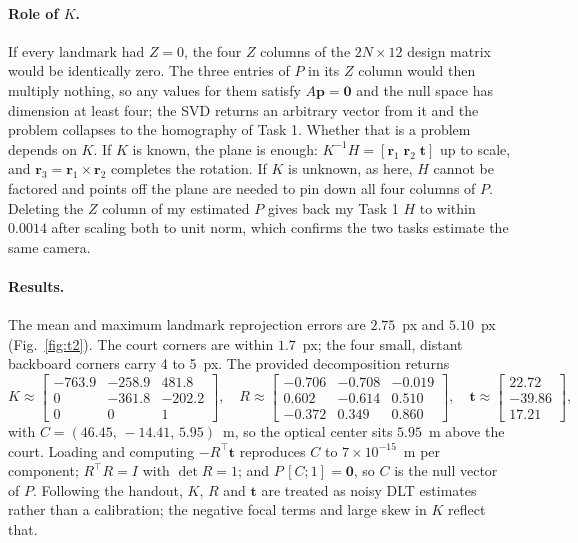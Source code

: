 \documentclass[11pt]{article}
\begin{document}
\paragraph{Role of $K$.} If every landmark had $Z=0$, the four $Z$ columns of the $2N\times12$
design matrix would be identically zero. The three entries of $P$ in its $Z$
column would then multiply nothing, so any values for them satisfy
$A\mathbf p=\mathbf 0$ and the null space has dimension at least four; the SVD
returns an arbitrary vector from it and the problem collapses to the homography
of Task 1. Whether that is a problem depends on $K$. If $K$ is known, the plane
is enough: $K^{-1}H=[\mathbf r_1\;\mathbf r_2\;\mathbf t]$ up to scale, and
$\mathbf r_3=\mathbf r_1\times\mathbf r_2$ completes the rotation. If $K$ is
unknown, as here, $H$ cannot be factored and points off the plane are needed to
pin down all four columns of $P$. Deleting the $Z$ column of my estimated $P$
gives back my Task 1 $H$ to within $0.0014$ after scaling both to unit norm,
which confirms the two tasks estimate the same camera.

\paragraph{Results.} The mean and maximum landmark reprojection errors are $2.75$~px and
$5.10$~px (Fig.~\ref{fig:t2}). The court corners are within $1.7$~px; the four
small, distant backboard corners carry 4 to 5~px. The provided decomposition
returns
\[
K\approx\begin{bmatrix}-763.9&-258.9&481.8\\0&-361.8&-202.2\\0&0&1\end{bmatrix},\quad
R\approx\begin{bmatrix}-0.706&-0.708&-0.019\\0.602&-0.614&0.510\\-0.372&0.349&0.860\end{bmatrix},\quad
\mathbf t\approx\begin{bmatrix}22.72\\-39.86\\17.21\end{bmatrix},
\]
with $C=(46.45,\,-14.41,\,5.95)$~m, so the optical center sits $5.95$~m above the
court. Loading  and computing $-R^\top\mathbf t$
reproduces $C$ to $7\times10^{-15}$~m per component; $R^\top R=I$ with
$\det R=1$; and $P\,[C;1]=\mathbf 0$, so $C$ is the null vector of $P$. Following
the handout, $K$, $R$ and $\mathbf t$ are treated as noisy DLT estimates rather
than a calibration; the negative focal terms and large skew in $K$ reflect
that.
\end{document}
